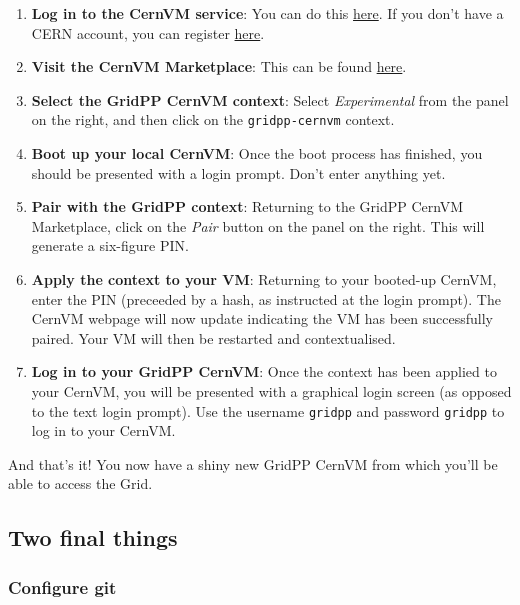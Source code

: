 \begin{enumerate}
\def\labelenumi{\arabic{enumi}.}
\tightlist
\item
  \textbf{Log in to the CernVM service}: You can do this
  \href{https://cernvm-online.cern.ch/user/login}{here}. If you don't
  have a CERN account, you can register
  \href{https://cernvm-online.cern.ch/user/register}{here}.
\item
  \textbf{Visit the CernVM Marketplace}: This can be found
  \href{https://cernvm-online.cern.ch/market/list}{here}.
\item
  \textbf{Select the GridPP CernVM context}: Select \emph{Experimental}
  from the panel on the right, and then click on the
  \texttt{gridpp-cernvm} context.
\item
  \textbf{Boot up your local CernVM}: Once the boot process has
  finished, you should be presented with a login prompt. Don't enter
  anything yet.
\item
  \textbf{Pair with the GridPP context}: Returning to the GridPP CernVM
  Marketplace, click on the \emph{Pair} button on the panel on the
  right. This will generate a six-figure PIN.
\item
  \textbf{Apply the context to your VM}: Returning to your booted-up
  CernVM, enter the PIN (preceeded by a hash, as instructed at the login
  prompt). The CernVM webpage will now update indicating the VM has been
  successfully paired. Your VM will then be restarted and
  contextualised.
\item
  \textbf{Log in to your GridPP CernVM}: Once the context has been
  applied to your CernVM, you will be presented with a graphical login
  screen (as opposed to the text login prompt). Use the username
  \texttt{gridpp} and password \texttt{gridpp} to log in to your CernVM.
\end{enumerate}

And that's it! You now have a shiny new GridPP CernVM from which you'll
be able to access the Grid.

\subsection{Two final things}
\label{two-final-things}

\subsubsection{Configure git}\label{configure-git}

